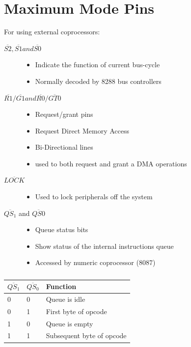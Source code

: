 \section{Maximum Mode Pins}
For using external coprocessors:
\begin{description}

    \item[$\overline{S2} , \overline{S1} and \overline{S0} $]
    \begin{itemize}
        \item Indicate the function of current bus-cycle
        \item Normally decoded by 8288 bus controllers
    \end{itemize}

    \item[$\overline{R1} / \overline{G1} and \overline{R0} / \overline{GT0} $]
    \begin{itemize}
        \item Request/grant pins
        \item Request Direct Memory Access
        \item Bi-Directional lines
        \item used to both request and grant a DMA operations
    \end{itemize}

    \item[$\overline{LOCK} $]
    \begin{itemize}
        \item Used to lock peripherals off the system
    \end{itemize}

    \item[$\overline{QS_1}$  and $\overline{QS0} $]
    \begin{itemize}
        \item Queue status bits
        \item Show status of the internal instructions queue
        \item Accessed by numeric coprocessor (8087)
    \end{itemize}

\end{description}

\begin{table}[h!]
\centering
\begin{tabular}{ |p{1cm}|p{1cm}|p{3cm}|  }
\hline
$ \overline{QS_1} $ & $ \overline{QS_0} $  & Function   \\
\hline
0 & 0 & Queue is idle \\
0 & 1 & First byte of opcode \\
1 & 0 & Queue is empty\\
1 & 1 & Subsequent byte of opcode \\
\hline
\end{tabular}

\caption{}
\label{table:4}
\end{table}

